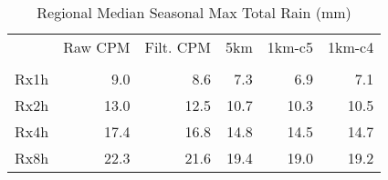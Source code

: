 \begin{table}
\caption{Regional Median Seasonal Max Total Rain (mm)}
\label{tab:max_rain}
\begin{tabular}{lrrrrr}
\toprule
 & Raw CPM & Filt. CPM & 5km & 1km-c5 & 1km-c4 \\
 &  &  &  &  &  \\
\midrule
Rx1h & 9.0 & 8.6 & 7.3 & 6.9 & 7.1 \\
Rx2h & 13.0 & 12.5 & 10.7 & 10.3 & 10.5 \\
Rx4h & 17.4 & 16.8 & 14.8 & 14.5 & 14.7 \\
Rx8h & 22.3 & 21.6 & 19.4 & 19.0 & 19.2 \\
\bottomrule
\end{tabular}
\end{table}
